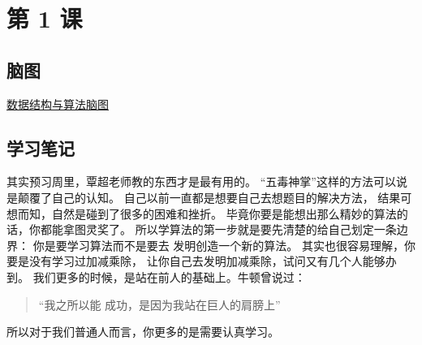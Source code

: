 \newpage
\section{第 1 课}

\subsection{脑图}

\href{https://github.com/MDGSF/algorithm005-class02/blob/master/Week_00/G20190343020039/%E7%AE%97%E6%B3%95%E8%84%91%E5%9B%BE.jpeg}{数据结构与算法脑图}

\subsection{学习笔记}

其实预习周里，覃超老师教的东西才是最有用的。 
``五毒神掌''这样的方法可以说是颠覆了自己的认知。 
自己以前一直都是想要自己去想题目的解决方法， 
结果可想而知，自然是碰到了很多的困难和挫折。 
毕竟你要是能想出那么精妙的算法的话，你都能拿图灵奖了。
所以学算法的第一步就是要先清楚的给自己划定一条边界：
你是要学习算法而不是要去 发明创造一个新的算法。
其实也很容易理解，你要是没有学习过加减乘除，
让你自己去发明加减乘除，试问又有几个人能够办到。
我们更多的时候，是站在前人的基础上。牛顿曾说过：
\begin{quote}
``我之所以能 成功，是因为我站在巨人的肩膀上''
\end{quote}
所以对于我们普通人而言，你更多的是需要认真学习。
